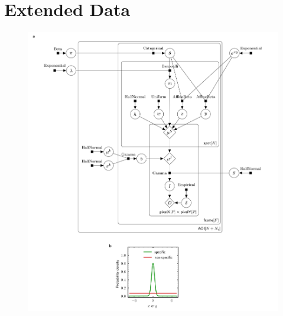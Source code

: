 \clearpage
\newpage
\section*{Extended Data}
\pagebreak

\renewcommand{\figurename}{Extended Data Fig.}
\renewcommand{\tablename}{Extended Data Table}
\setcounter{figure}{0}

\begin{figure}[t]
\centering
\includegraphics[width=\textwidth]{extended-data/figure1.png}
\label{fig:full_model}
\end{figure}

